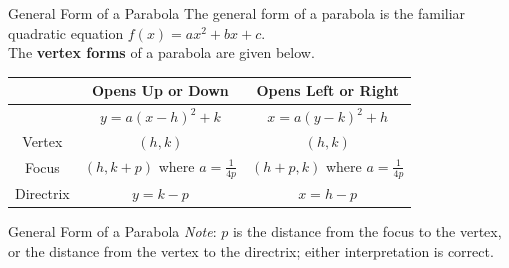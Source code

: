 \documentclass[t]{beamer}
\begin{document}
\begin{frame}{General Form of a Parabola}
The general form of a parabola is the familiar quadratic equation $f(x) = ax^2 + bx + c$.	\newline\\	\pause
The {\color{blue}\textbf{vertex forms}} of a parabola are given below.

\begin{center}
    \setlength{\extrarowheight}{7pt}
    \begin{tabular}{c|c|c}
    &   \textbf{Opens Up or Down}   &   \textbf{Opens Left or Right}    \\  \hline
    &   $y = a(x-h)^2 + k$  &   $x = a(y-k)^2 + h$  \\[5pt]  \hline
    Vertex  &   $(h,k)$ &   $(h,k)$ \\[5pt]  \hline
    Focus   &   $(h,k+p)$ where $a = \frac{1}{4p}$   &   $(h+p,k)$ where $a = \frac{1}{4p}$  \\[5pt] \hline
    Directrix   &   $y = k-p$   &   $x = h-p$   \\
    \end{tabular}
\end{center}
\end{frame}

\begin{frame}{General Form of a Parabola}
\emph{Note}: $p$ is the distance from the focus to the vertex, or the distance from the vertex to the directrix; either interpretation is correct.	\newline\\

\begin{center}
\end{center}
\end{frame}
\end{document}
